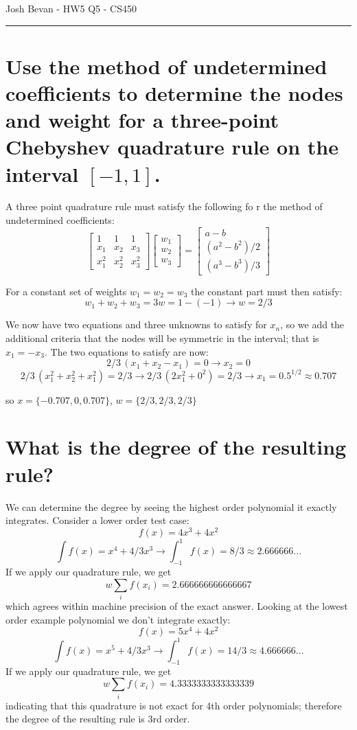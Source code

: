 \documentclass[letterpaper,10pt]{article}
\newcommand{\bm}[1]{%
	\begin{bmatrix}#1\end{bmatrix}%
}
\begin{document}
\begin{flushright}
{\Large Josh Bevan - HW5 Q5 - CS450}
\end{flushright}
\vskip -0.1in
\hrule
\vskip 0.3in

\section*{ Use the method of undetermined coefficients to determine the nodes and weight for a three-point Chebyshev quadrature rule on the interval $[-1,1]$.}

A three point quadrature rule must satisfy the following fo r the method of undetermined coefficients:
$$\bm{ 1 & 1 &1 \\ x_1 & x_2 & x_3 \\ x_1^2 & x_2^2 & x_3^2}
    \begin{bmatrix} w_1 \\ w_2 \\ w_3 \end{bmatrix} =
    \begin{bmatrix} a-b \\ (a^2-b^2)/2 \\ (a^3-b^3)/3 \end{bmatrix}$$
    
For a constant set of weights $w_1 = w_2 = w_3$ the constant part must then satisfy:
$$w_1 +w_2 +w_3 = 3w = 1-(-1) \rightarrow w=2/3$$

We now have two equations and three unknowns to satisfy for $x_n$, so we add the additional criteria that the nodes will be symmetric in the interval; that is $x_1 = -x_3$. The two equations to satisfy are now:
$$2/3 \,(x_1 + x_2 - x_1) = 0 \rightarrow x_2 = 0$$
$$2/3 \,(x_1^2 + x_2^2 +x_1^2) = 2/3 \rightarrow 2/3 \,(2x_1^2 + 0^2) =2/3 \rightarrow x_1 = 0.5^{1/2} \approx 0.707$$

so $x = \{-0.707, 0, 0.707\}$, $w = \{2/3, 2/3, 2/3\}$

\section*{What is the degree of the resulting rule?}
We can determine the degree by seeing the highest order polynomial it exactly integrates. Consider a lower order test case:
$$ f(x) = 4x^3+4x^2 $$
$$ \int f(x) =  x^4 + 4/3 x^3 \rightarrow \int_{-1}^1 f(x) = 8/3 \approx 2.666666...$$
If we apply our quadrature rule, we get
$$ w \sum_i f(x_i) = 2.666666666666667$$
which agrees within machine precision of the exact answer.
Looking at the lowest order example polynomial we don't integrate exactly:
$$ f(x) = 5x^4+4x^2 $$
$$ \int f(x) =  x^5 + 4/3 x^3 \rightarrow \int_{-1}^1 f(x) = 14/3 \approx 4.666666...$$
If we apply our quadrature rule, we get
$$ w \sum_i f(x_i) = 4.3333333333333339$$
indicating that this quadrature is not exact for 4th order polynomials; therefore the degree of the resulting rule is 3rd order.
\end{document}
